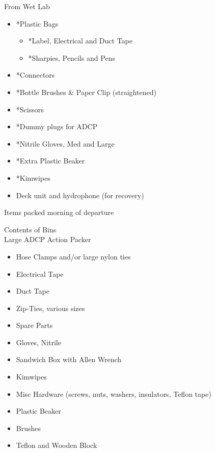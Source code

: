 \documentclass[
]{book}
\providecommand{\tightlist}{%
  \setlength{\itemsep}{0pt}\setlength{\parskip}{0pt}}
\begin{document}
From Wet Lab

\begin{itemize}
\tightlist
\item
  *Plastic Bags

  \begin{itemize}
  \tightlist
  \item
    *Label, Electrical and Duct Tape\\
  \item
    *Sharpies, Pencils and Pens
  \end{itemize}
\item
  *Connectors
\item
  *Bottle Brushes \& Paper Clip (straightened)
\item
  *Scissors
\item
  *Dummy plugs for ADCP
\item
  *Nitrile Gloves, Med and Large
\item
  *Extra Plastic Beaker
\item
  *Kimwipes
\item
  Deck unit and hydrophone (for recovery)
\end{itemize}

Items packed morning of departure

Contents of Bins\\
Large ADCP Action Packer

\begin{itemize}
\tightlist
\item
  Hose Clamps and/or large nylon ties
\item
  Electrical Tape\\
\item
  Duct Tape\\
\item
  Zip-Ties, various sizes\\
\item
  Spare Parts\\
\item
  Gloves, Nitrile\\
\item
  Sandwich Box with Allen Wrench\\
\item
  Kimwipes\\
\item
  Misc Hardware (screws, nuts, washers, insulators, Teflon tape)\\
\item
  Plastic Beaker\\
\item
  Brushes\\
\item
  Teflon and Wooden Block
\end{itemize}
\end{document}
